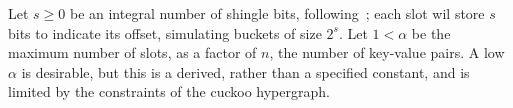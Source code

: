 \documentclass[11pt,letterpaper]{article}
\begin{document}






Let $s \geq 0$ be an integral number of shingle bits, following~\cite{lehman20093}; each slot wil store $s$ bits to indicate its offset, simulating buckets of size $2^s$.
Let $1 < \alpha$ be the maximum number of slots, as a factor of $n$, the number of key-value pairs.
A low $\alpha$ is desirable, but this is a derived, rather than a specified constant, and is limited by the constraints of the cuckoo hypergraph.
\end{document}
